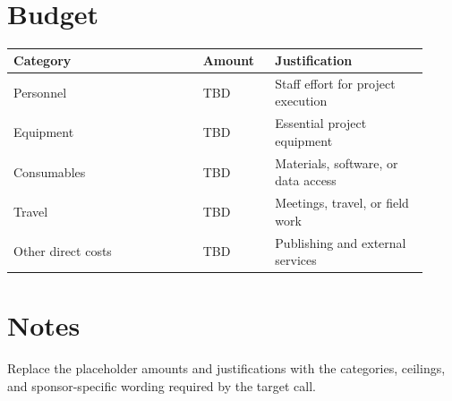 \documentclass{article}
\title{\vspace{\TitleTopVSpace}\textbf{\BudgetTitle}\\[0.5em]
\normalsize \ApplicantName\\
\normalsize \ApplicantAffiliation}
\begin{document}
\maketitle
\vspace{\StandaloneTitleBottomVSpace}

\section*{Budget}

\begin{tabular}{p{0.42\linewidth} p{0.16\linewidth} p{0.34\linewidth}}
\toprule
Category & Amount & Justification \\
\midrule
Personnel & TBD & Staff effort for project execution \\
Equipment & TBD & Essential project equipment \\
Consumables & TBD & Materials, software, or data access \\
Travel & TBD & Meetings, travel, or field work \\
Other direct costs & TBD & Publishing and external services \\
\bottomrule
\end{tabular}

\section*{Notes}

Replace the placeholder amounts and justifications with the categories,
ceilings, and sponsor-specific wording required by the target call.
\end{document}
